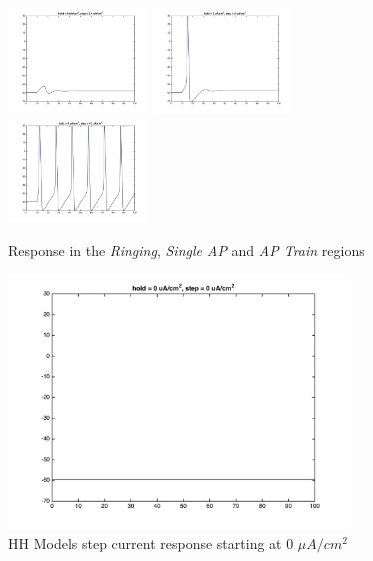 \documentclass{beamer}
\begin{document}
\begin{frame}
  \begin{figure}
    \centering
    \includegraphics[width = 0.33\textwidth]{./images/current_0_2p4.jpg}
    \includegraphics[width = 0.33\textwidth]{./images/current_0_3.jpg}
    \includegraphics[width = 0.33\textwidth]{./images/current_0_10.jpg}
    \caption{Response in the \emph{Ringing}, \emph{Single AP} and \emph{AP Train} regions}
  \end{figure}
\end{frame}

\begin{frame}
  \begin{figure}
    \centering
    \includegraphics[width = 0.8\textwidth]{./images/current_0_0.jpg}
    \caption{HH Models step current response starting at 0 $\mu A/cm^2$}
  \end{figure}
\end{frame}
\end{document}
